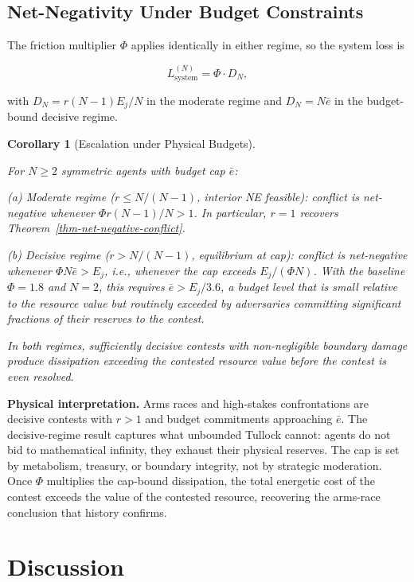 \documentclass[11pt]{article}
\theoremstyle{plain}
\newtheorem{corollary}[theorem]{Corollary}
\theoremstyle{definition}
\theoremstyle{remark}
\let\origsection\section
\renewcommand{\section}{\needspace{12\baselineskip}\origsection}
\let\origsubsection\subsection
\renewcommand{\subsection}{\needspace{7\baselineskip}\origsubsection}
\begin{document}
\subsection{Net-Negativity Under Budget
Constraints}\label{net-negativity-under-budget-constraints}

The friction multiplier \(\Phi\) applies identically in either regime,
so the system loss is

\[L_{\text{system}}^{(N)} = \Phi \cdot D_N,\]

with \(D_N = r(N-1) E_j/N\) in the moderate regime and
\(D_N = N \bar e\) in the budget-bound decisive regime.

\begin{corollary}[Escalation under Physical Budgets]
\label{cor-escalation-instability}

For $N \geq 2$ symmetric agents with budget cap $\bar e$:

(a) \emph{Moderate regime} ($r \leq N/(N-1)$, interior NE feasible): conflict is net-negative whenever $\Phi r (N-1)/N > 1$. In particular, $r = 1$ recovers Theorem~\ref{thm-net-negative-conflict}.

(b) \emph{Decisive regime} ($r > N/(N-1)$, equilibrium at cap): conflict is net-negative whenever $\Phi N \bar e > E_j$, i.e., whenever the cap exceeds $E_j/(\Phi N)$. With the baseline $\Phi = 1.8$ and $N = 2$, this requires $\bar e > E_j/3.6$, a budget level that is small relative to the resource value but routinely exceeded by adversaries committing significant fractions of their reserves to the contest.

In both regimes, sufficiently decisive contests with non-negligible boundary damage produce dissipation exceeding the contested resource value before the contest is even resolved.
\end{corollary}

\textbf{Physical interpretation.} Arms races and high-stakes
confrontations are decisive contests with \(r > 1\) and budget
commitments approaching \(\bar e\). The decisive-regime result captures
what unbounded Tullock cannot: agents do not bid to mathematical
infinity, they exhaust their physical reserves. The cap is set by
metabolism, treasury, or boundary integrity, not by strategic
moderation. Once \(\Phi\) multiplies the cap-bound dissipation, the
total energetic cost of the contest exceeds the value of the contested
resource, recovering the arms-race conclusion that history confirms.

\section{Discussion}\label{discussion}
\end{document}
